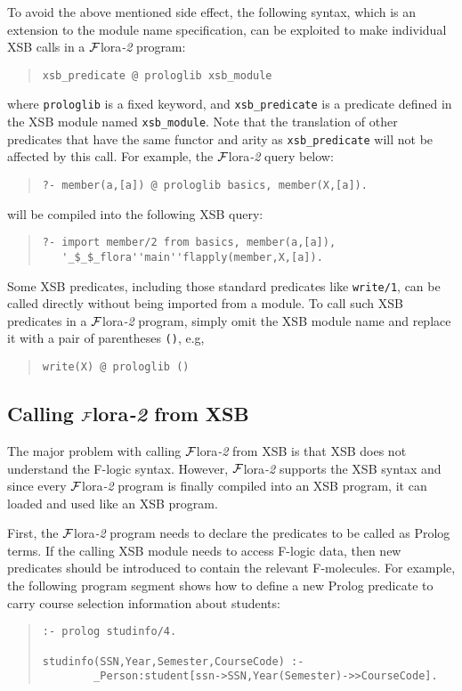 \documentclass[11pt]{article}
\newcommand{\FLORA}{{\mbox{${\cal F}${\sc lora}\rm\emph{-2}}}\xspace}
\newcommand{\fl}{\mbox{F-logic}\xspace}
\begin{document}
%
To avoid the above mentioned side effect, the following syntax, which
is an extension to the module name specification, can be exploited to
make individual XSB calls in a \FLORA program:
\begin{quote}
\begin{verbatim}
xsb_predicate @ prologlib xsb_module
\end{verbatim}
\end{quote}
where {\tt prologlib} is a fixed keyword, and \verb|xsb_predicate| is a
predicate defined in the XSB module named \verb|xsb_module|. Note that
the translation of other predicates that have the same functor and
arity as \verb|xsb_predicate| will not be affected by this call. For
example, the \FLORA query below:
\begin{quote}
\verb|?- member(a,[a]) @ prologlib basics, member(X,[a]).|
\end{quote}
will be compiled into the following XSB query:
\begin{quote}
\begin{verbatim}
?- import member/2 from basics, member(a,[a]),
   '_$_$_flora''main''flapply(member,X,[a]).
\end{verbatim}
\end{quote}

Some XSB predicates, including those standard predicates like
{\tt write/1}, can be called directly without being imported from a
module. To call such XSB predicates in a \FLORA program, simply omit
the XSB module name and replace it with a pair of parentheses {\tt ()},
e.g,
\begin{quote}
\verb|write(X) @ prologlib ()|
\end{quote}


\subsection{Calling \FLORA from XSB}

\index{module!calling \FLORA}
%
The major problem with calling \FLORA from XSB is that XSB does not
understand the \fl syntax. However, \FLORA supports the XSB syntax and
since every \FLORA program is finally compiled into an XSB program, it
can loaded and used like an XSB program.

First, the \FLORA program needs to declare the predicates to be called
as Prolog terms. If the calling XSB module needs to access \fl data,
then new predicates should be introduced to contain the relevant
F-molecules.  For example, the following program segment shows how to
define a new Prolog predicate to carry course selection information
about students:
\begin{quote}
\begin{verbatim}
:- prolog studinfo/4.

studinfo(SSN,Year,Semester,CourseCode) :-
        _Person:student[ssn->SSN,Year(Semester)->>CourseCode].
\end{verbatim}
\end{quote}
\end{document}
